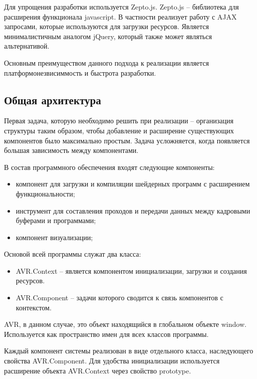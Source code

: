 Для упрощения разработки используется Zepto.js. Zepto.js -- библиотека для расширения функционала 
javascript. В частности реализует работу с AJAX запросами, которые используются для загрузки 
ресурсов. Является минималистичным аналогом jQuery, который также может являться альтернативой.

Основным преимуществом данного подхода к реализации является платформонезвисиммость и быстрота 
разработки.

\subsection{Общая архитектура}

Первая задача, которую необходимо решить при реализации -- организация структуры таким образом, 
чтобы добавление и расширение существующих компонентов было максимально простым. Задача
усложняется, когда появляется большая зависимость между компонентами.

В состав программного обеспечения входят следующие компоненты:

\begin{itemize}
  \item компонент для загрузки и компиляции шейдерных программ с расширением
    функциональности;
  \item инструмент для составления проходов и передачи данных между кадровыми буферами и 
    программами;
  \item компонент визуализации;
\end{itemize}

Основой всей программы служат два класса: 

\begin{itemize}
  \item AVR.Context -- является компонентом инициализации, загрузки и создания ресурсов.
  \item AVR.Component -- задачи которого сводится к связь компонентов с контекстом.
\end{itemize}

AVR, в данном случае, это объект находящийся в глобальном объекте window. Используется 
как пространство имен для всех классов программы. 

Каждый компонент системы реализован в виде отдельного класса, наследующего свойства 
AVR.Component. Для удобства инициализации используется расширение объекта AVR.Context
через свойство prototype.

